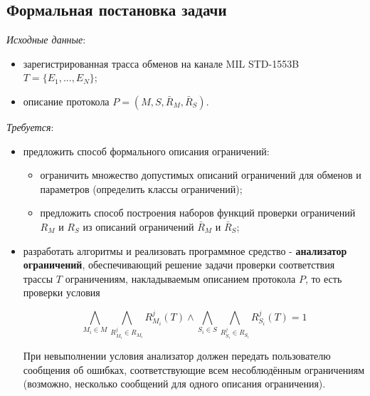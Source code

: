  
\subsection{Формальная постановка задачи}

\textit{Исходные данные}: 

\begin{itemize}
 \item зарегистрированная трасса обменов на канале MIL STD-1553B $T = \{E_1, 
..., E_N\}$;
 \item описание протокола $P = (M, S, \bar{R}_M, \bar{R}_S)$.
\end{itemize}

\textit{Требуется}: 

\begin{itemize}
 \item предложить способ формального описания ограничений:
 \begin{itemize}
  \item ограничить множество допустимых описаний ограничений для обменов и 
параметров (определить классы ограничений);
  \item предложить способ построения наборов функций проверки ограничений 
$R_M$ и $R_S$ из описаний ограничений $\bar{R}_M$ и $\bar{R}_S$;
 \end{itemize}
 \item разработать алгоритмы и реализовать программное средство - 
\textbf{анализатор ограничений}, обеспечивающий решение задачи проверки 
соответствия трассы $T$ ограничениям, накладываемым описанием протокола $P$, то 
есть проверки условия

$$\bigwedge\limits_{M_i \in M} \bigwedge\limits_{R_{M_i}^j \in R_{M_i}} 
R_{M_i}^j(T) \wedge \bigwedge\limits_{S_i \in S} \bigwedge\limits_{R_{S_i}^j 
\in R_{S_i}} R_{S_i}^j(T) = 1$$

При невыполнении условия анализатор должен передать пользователю сообщения об 
ошибках, соответствующие всем несоблюдённым ограничениям (возможно, несколько 
сообщений для одного описания ограничения).
\end{itemize}